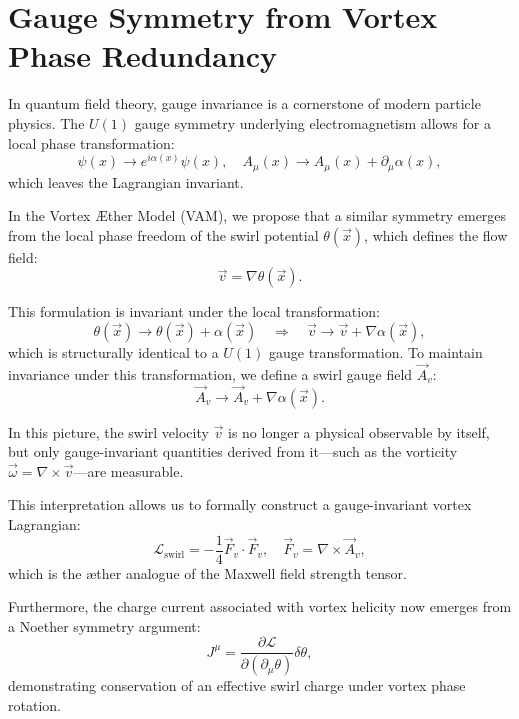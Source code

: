 \section*{Gauge Symmetry from Vortex Phase Redundancy}

In quantum field theory, gauge invariance is a cornerstone of modern particle physics. The $U(1)$ gauge symmetry underlying electromagnetism allows for a local phase transformation:
\begin{equation}
\psi(x) \rightarrow e^{i\alpha(x)} \psi(x), \quad A_\mu(x) \rightarrow A_\mu(x) + \partial_\mu \alpha(x),
\end{equation}
which leaves the Lagrangian invariant.

In the Vortex Æther Model (VAM), we propose that a similar symmetry emerges from the local phase freedom of the swirl potential $\theta(\vec{x})$, which defines the flow field:
\begin{equation}
\vec{v} = \nabla \theta(\vec{x}).
\end{equation}

This formulation is invariant under the local transformation:
\begin{equation}
\theta(\vec{x}) \rightarrow \theta(\vec{x}) + \alpha(\vec{x}) \quad \Rightarrow \quad \vec{v} \rightarrow \vec{v} + \nabla \alpha(\vec{x}),
\end{equation}
which is structurally identical to a $U(1)$ gauge transformation. To maintain invariance under this transformation, we define a swirl gauge field $\vec{A}_v$:
\begin{equation}
\vec{A}_v \rightarrow \vec{A}_v + \nabla \alpha(\vec{x}).
\end{equation}

In this picture, the swirl velocity $\vec{v}$ is no longer a physical observable by itself, but only gauge-invariant quantities derived from it—such as the vorticity $\vec{\omega} = \nabla \times \vec{v}$—are measurable.

This interpretation allows us to formally construct a gauge-invariant vortex Lagrangian:
\begin{equation}
\mathcal{L}_{\text{swirl}} = -\frac{1}{4} \vec{F}_v \cdot \vec{F}_v, \quad \vec{F}_v = \nabla \times \vec{A}_v,
\end{equation}
which is the æther analogue of the Maxwell field strength tensor.

Furthermore, the charge current associated with vortex helicity now emerges from a Noether symmetry argument:
\begin{equation}
J^\mu = \frac{\partial \mathcal{L}}{\partial (\partial_\mu \theta)} \delta \theta,
\end{equation}
demonstrating conservation of an effective swirl charge under vortex phase rotation.

